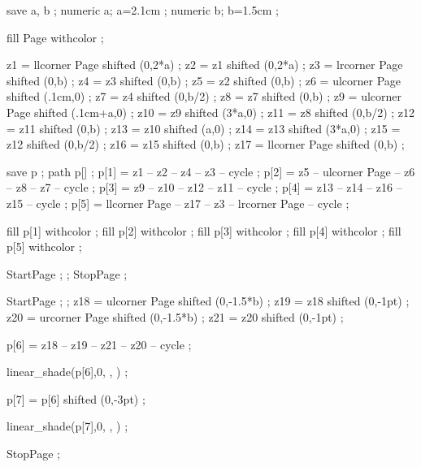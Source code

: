 
save a, b ;
numeric a; a=2.1cm ;
numeric b; b=1.5cm ;

fill Page withcolor  ;

z1 = llcorner Page shifted (0,2*a) ;
z2 = z1 shifted (0,2*a) ;
z3 = lrcorner Page shifted (0,b) ;
z4 = z3 shifted (0,b) ;
z5 = z2 shifted (0,b) ;
z6 = ulcorner Page  shifted (.1cm,0) ;
z7 = z4 shifted (0,b/2) ;
z8 = z7 shifted (0,b) ;
z9 = ulcorner Page shifted (.1cm+a,0) ;
z10 = z9 shifted (3*a,0) ;
z11 = z8 shifted (0,b/2) ;
z12 = z11 shifted (0,b) ;
z13 = z10 shifted (a,0) ;
z14 = z13 shifted (3*a,0) ;
z15 = z12 shifted (0,b/2) ;
z16 = z15 shifted (0,b) ;
z17 = llcorner Page shifted (0,b) ;

save p ;
path p[] ;
p[1] = z1 -- z2 -- z4 -- z3 -- cycle ;
p[2] = z5 -- ulcorner Page -- z6 -- z8 -- z7 -- cycle ;
p[3] = z9 -- z10 -- z12 -- z11 -- cycle ;
p[4] = z13 -- z14 -- z16 -- z15 -- cycle ;
p[5] = llcorner Page -- z17 -- z3 -- lrcorner Page -- cycle ;

fill p[1] withcolor  ;
fill p[2] withcolor  ;
fill p[3] withcolor  ;
fill p[4] withcolor  ;
fill p[5] withcolor  ;
\stopuseMPgraphic

StartPage ;
 ;
StopPage ;
\stopuniqueMPgraphic

StartPage ;
 ;
z18 = ulcorner Page shifted (0,-1.5*b) ;
z19 = z18 shifted (0,-1pt) ;
z20 = urcorner Page shifted (0,-1.5*b) ;
z21 = z20 shifted (0,-1pt) ;

p[6] = z18 -- z19 -- z21 -- z20 -- cycle ;

linear_shade(p[6],0,
             ,
             ) ;

p[7] = p[6] shifted (0,-3pt) ;

linear_shade(p[7],0,
             ,
             ) ;

StopPage ;
\stopuniqueMPgraphic



